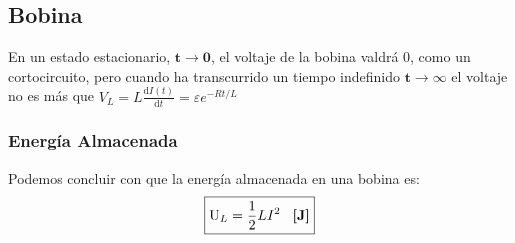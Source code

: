 \subsection{Bobina}
\begin{wrapfigure}{r}{2cm}
\end{wrapfigure}
\noindent En un estado estacionario, \(\mathbf{t \rightarrow 0}\), el voltaje de la bobina valdrá 0, como un cortocircuito, pero cuando ha transcurrido un tiempo indefinido \(\mathbf{t \rightarrow \infty}\) el voltaje no es más que \(V_L = L \frac{\mathrm{d}I(t)}{\mathrm{d}t} = \varepsilon e^{-Rt/L}\)
\subsubsection{Energía Almacenada}
\noindent Podemos concluir con que la energía almacenada en una bobina es:
\[
        \boxed{\mathrm{U}_L = \frac{1}{2}LI^2 \hspace{3mm} \textnormal{\textbf{[J]}}}
\]